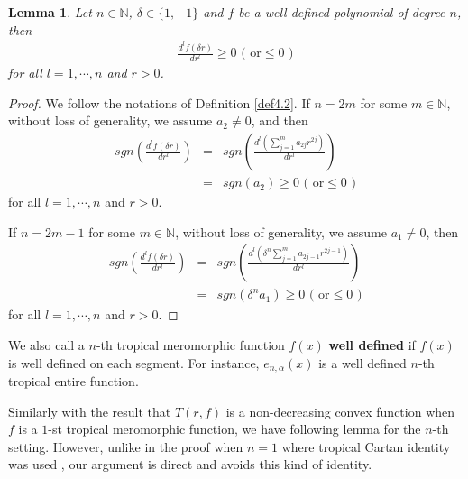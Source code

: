 \documentclass{article}
\newtheorem{lemma}[defin]{Lemma}
\begin{document}
\begin{lemma}\label{4.3.0}
    Let $n\in\mathbb{N}$, $\delta\in\{1, -1\}$ and $f$ be a well defined polynomial of degree $n$, then
    \begin{eqnarray}\label{4dp}
    \frac{d^{l}f(\delta r)}{d r^{l}}\geq 0 \text{ ( or}\leq 0 \text{ )}
\end{eqnarray}
for all $l=1, \cdots, n$ and $r>0$.
\end{lemma}

\begin{proof}
    We follow the notations of Definition \ref{def4.2}. If $n=2m$ for some $m\in\mathbb{N}$, without loss of generality, we assume $a_{2}\neq 0$, and then
    \begin{eqnarray*}
        sgn\left(\frac{d^{l}f(\delta r)}{d r^{l}}\right)&=&sgn\left(\frac{d^{l}(\sum_{j=1}^{m}a_{2j}r^{2j})}{dr^{l}}\right)\\
        &=&sgn\left(a_{2}\right)\geq 0 \text{ ( or}\leq 0 \text{ )}
    \end{eqnarray*}
    for all $l=1, \cdots, n$ and $r>0$.

    If $n=2m-1$ for some $m\in\mathbb{N}$, without loss of generality, we assume $a_{1}\neq 0$, then
    \begin{eqnarray*}
        sgn\left(\frac{d^{l}f(\delta r)}{d r^{l}}\right)&=&sgn\left(\frac{d^{l}(\delta^{n}\sum_{j=1}^{m}a_{2j-1}r^{2j-1})}{dr^{l}}\right)\\
        &=&sgn\left(\delta^{n}a_{1}\right)\geq 0 \text{ ( or}\leq 0 \text{ )}
    \end{eqnarray*}
    for all $l=1, \cdots, n$ and $r>0$.
\end{proof}

We also call a $n$-th tropical meromorphic function $f(x)$ \textbf{ well defined} if $f(x)$ is well defined on each segment. For instance, $e_{n, \alpha}(x)$ is a well defined $n$-th tropical entire function.

Similarly with the result that $T(r, f)$ is a non-decreasing convex function when $f$ is a $1$-st tropical meromorphic function, we have following lemma for the $n$-th setting. However, unlike in the proof when $n=1$ where tropical Cartan identity was used \cite[Theorem 3.8]{Rbook}, our argument is direct and avoids this kind of identity.
\end{document}

